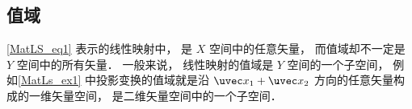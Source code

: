 \subsection{值域}
\autoref{MatLS_eq1} 表示的线性映射中， 是 $X$ 空间中的任意矢量， 而值域却不一定是 $Y$ 空间中的所有矢量． 一般来说， 线性映射的值域是 $Y$ 空间的一个子空间， 例如\autoref{MatLs_ex1} 中投影变换的值域就是沿 $\uvec x_1 + \uvec x_2$ 方向的任意矢量构成的一维矢量空间， 是二维矢量空间中的一个子空间．

